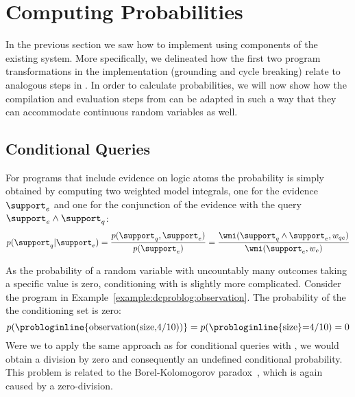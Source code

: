 
\section{Computing Probabilities}\label{sec:inference}


In the previous section we saw how to implement \dcproblogsty using components of the existing \problogsys system. More specifically, we delineated how the first two program transformations in the \dcproblogsys implementation (grounding and cycle breaking) relate to analogous steps in \problogsys.
In order to calculate probabilities, we will now show how the compilation and evaluation steps from \problogsys can be adapted in such a way that they can accommodate continuous random variables as well.



\subsection{Conditional Queries}




For \dcproblogsty programs that include evidence on logic atoms the probability is simply obtained by computing two weighted model integrals, one for the evidence $\support_e$ and one for the conjunction of the evidence with the query $\support_e \land \support_q$:
\begin{equation}
	p(\support_q|\support_e)=\frac{p(\support_q,\support_e)}{p(\support_e)}=\frac{\wmi(\support_q \land \support_e,w_{qe})}{\wmi(\support_e,w_e)}
\end{equation}


As the probability of a random variable with uncountably many outcomes taking a specific value is zero, conditioning with  is slightly more complicated. Consider the program in Example~\ref{example:dcproblog:observation}. The probability of the the conditioning set is zero:
\begin{equation}
	p(\text{\probloginline{observation(size,4/10))}}=p(\text{\probloginline{size}=4/10})=0
\end{equation}
Were we to apply the same approach as for conditional queries with , we would obtain a division by zero and consequently an undefined conditional probability. 
This problem is related to the Borel-Kolomogorov paradox~\citep{kolmogorov1950foundations,gyenis2017conditioning}, which is again caused by a zero-division.

